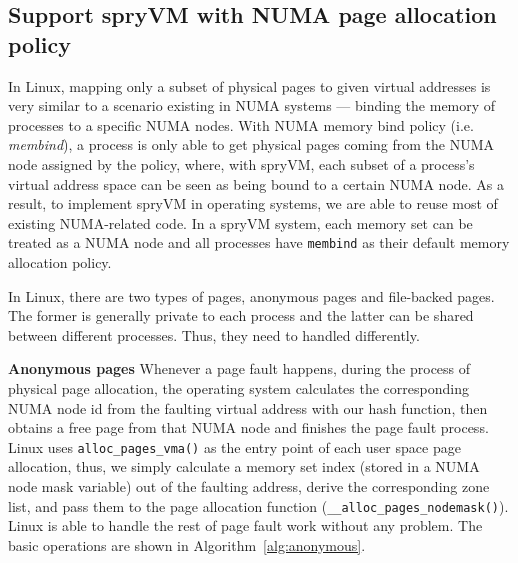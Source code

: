 \begin{comment}

\end{comment}

\subsection{Support spryVM with NUMA page allocation policy}
In Linux,  mapping only a subset of physical pages to given virtual addresses is very similar to a scenario existing in NUMA systems — binding the memory of processes to a specific NUMA nodes. With NUMA memory bind policy (i.e. \textit{membind}), a process is only able to get physical pages coming from the NUMA node assigned by the policy, where, with spryVM, each subset of a process’s virtual address space can be seen as being bound to a certain NUMA node. As a result, to implement spryVM in operating systems, we are able to reuse most of existing NUMA-related code. In a spryVM system, each memory set can be treated as a NUMA node and all processes have \verb|membind| as their default memory allocation policy.

In Linux, there are two types of pages, anonymous pages and file-backed pages. The former
is generally private to each process and the latter can be shared between different processes.
Thus, they need to handled differently.

\textbf{Anonymous pages} Whenever a page fault happens, during the process of physical page allocation, the operating system calculates the corresponding NUMA node id from the faulting virtual address with our hash function, then obtains a free page from that NUMA node and finishes the page fault process. Linux uses \verb|alloc_pages_vma()| as the entry point of each user space  page allocation, thus, we simply calculate a memory set index (stored in a NUMA node mask variable) out of the faulting address, derive the corresponding zone list, and pass them to the page allocation function (\verb|__alloc_pages_nodemask()|). Linux is able to handle the rest of page fault work without any problem. The basic operations are shown in Algorithm~\ref{alg:anonymous}.

